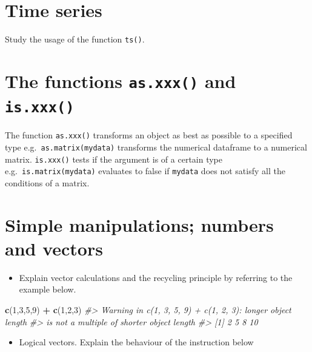 \documentclass[
]{book}
\newenvironment{Shaded}{\begin{snugshade}}{\end{snugshade}}
\newcommand{\CommentTok}[1]{\textcolor[rgb]{0.56,0.35,0.01}{\textit{#1}}}
\newcommand{\DecValTok}[1]{\textcolor[rgb]{0.00,0.00,0.81}{#1}}
\newcommand{\FunctionTok}[1]{\textcolor[rgb]{0.13,0.29,0.53}{\textbf{#1}}}
\newcommand{\NormalTok}[1]{#1}
\newcommand{\SpecialCharTok}[1]{\textcolor[rgb]{0.81,0.36,0.00}{\textbf{#1}}}
\providecommand{\tightlist}{%
  \setlength{\itemsep}{0pt}\setlength{\parskip}{0pt}}
\begin{document}
\section{Time series}\label{time-series}

Study the usage of the function \texttt{ts()}.

\section{\texorpdfstring{The functions \texttt{as.xxx()} and \texttt{is.xxx()}}{The functions as.xxx() and is.xxx()}}\label{the-functions-as.xxx-and-is.xxx}

The function \texttt{as.xxx()} transforms an object as best as possible to a specified type e.g.~\texttt{as.matrix(mydata)} transforms the numerical dataframe to a numerical matrix. \texttt{is.xxx()} tests if the argument is of a certain type e.g.~\texttt{is.matrix(mydata)} evaluates to false if \texttt{mydata} does not satisfy all the conditions of a matrix.

\section{Simple manipulations; numbers and vectors}\label{simple-manipulations-numbers-and-vectors}

\begin{itemize}
\tightlist
\item
  Explain vector calculations and the recycling principle by referring to the example below.
\end{itemize}

\begin{Shaded}
\begin{Highlighting}[]
\FunctionTok{c}\NormalTok{(}\DecValTok{1}\NormalTok{,}\DecValTok{3}\NormalTok{,}\DecValTok{5}\NormalTok{,}\DecValTok{9}\NormalTok{) }\SpecialCharTok{+} \FunctionTok{c}\NormalTok{(}\DecValTok{1}\NormalTok{,}\DecValTok{2}\NormalTok{,}\DecValTok{3}\NormalTok{)}
\CommentTok{\#\textgreater{} Warning in c(1, 3, 5, 9) + c(1, 2, 3): longer object length}
\CommentTok{\#\textgreater{} is not a multiple of shorter object length}
\CommentTok{\#\textgreater{} [1]  2  5  8 10}
\end{Highlighting}
\end{Shaded}

\begin{itemize}
\tightlist
\item
  Logical vectors. Explain the behaviour of the instruction below
\end{itemize}
\end{document}
